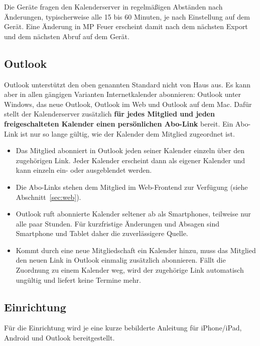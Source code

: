 \documentclass[a4paper,fontsize=10pt]{scrartcl}
\begin{document}
Die Geräte fragen den Kalenderserver in regelmäßigen Abständen nach
Änderungen, typischerweise alle 15 bis 60 Minuten, je nach Einstellung auf dem
Gerät. Eine Änderung in MP Feuer erscheint damit nach dem nächsten Export und
dem nächsten Abruf auf dem Gerät.

\subsection*{Outlook}

Outlook unterstützt den oben genannten Standard nicht von Haus aus. Es kann
aber in allen gängigen Varianten Internetkalender abonnieren: Outlook unter
Windows, das neue Outlook, Outlook im Web und Outlook auf dem Mac. Dafür stellt
der Kalenderserver zusätzlich \textbf{für jedes Mitglied und jeden
freigeschalteten Kalender einen persönlichen Abo-Link} bereit. Ein Abo-Link
ist nur so lange gültig, wie der Kalender dem Mitglied zugeordnet ist.

\begin{itemize}
  \item Das Mitglied abonniert in Outlook jeden seiner Kalender einzeln über
        den zugehörigen Link. Jeder Kalender erscheint dann als eigener
        Kalender und kann einzeln ein- oder ausgeblendet werden.
  \item Die Abo-Links stehen dem Mitglied im Web-Frontend zur Verfügung
        (siehe Abschnitt~\ref{sec:web}).
  \item Outlook ruft abonnierte Kalender seltener ab als Smartphones,
        teilweise nur alle paar Stunden. Für kurzfristige Änderungen
        und Absagen sind Smartphone und Tablet daher die zuverlässigere
        Quelle.
  \item Kommt durch eine neue Mitgliedschaft ein Kalender hinzu, muss das
        Mitglied den neuen Link in Outlook einmalig zusätzlich abonnieren.
        Fällt die Zuordnung zu einem Kalender weg, wird der zugehörige Link
        automatisch ungültig und liefert keine Termine mehr.
\end{itemize}

\subsection*{Einrichtung}

Für die Einrichtung wird je eine kurze bebilderte Anleitung für iPhone/iPad,
Android und Outlook bereitgestellt.

\end{document}
